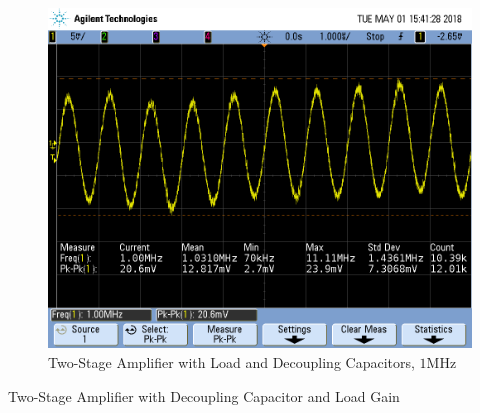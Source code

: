 \FloatBarrier

\FloatBarrier

\begin{figure}[h!]
	\centering
	\includegraphics[scale=0.45]{./images/SCOPE_16.PNG}
	\caption{Two-Stage Amplifier with Load and Decoupling Capacitors, $1$\si{\mega\hertz}}
	\label{fig:SCOPE_16}
\end{figure}

\FloatBarrier

\FloatBarrier

\begin{table}[h!]
	\centering
	\caption{Two-Stage Amplifier with Decoupling Capacitor and Load Gain}
	\label{tab:gain_part3_cascade}
\end{table}

\FloatBarrier
